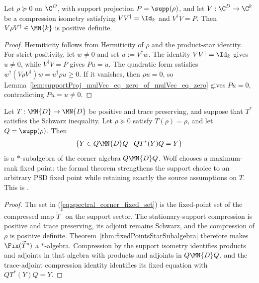 \begin{theorem}%
    \label{thm:compression_on_support_posDef}
    \leanok
    Let $\rho\succeq0$ on $\C^D$, with support projection
    $P=\supp(\rho)$, and let $V:\C^D\to\C^k$ be a compression isometry
    satisfying $VV^\dagger=\Id_k$ and $V^\dagger V=P$. Then
    $V\rho V^\dagger\in\MN{k}$ is positive definite.
\end{theorem}

\begin{proof}\leanok
    Hermiticity follows from Hermiticity of $\rho$ and the product-star
    identity. For strict positivity, let $w\neq0$ and set $u:=V^\dagger w$.
    The identity $VV^\dagger=\Id_k$ gives $u\neq0$, while
    $V^\dagger V=P$ gives $Pu=u$. The quadratic form satisfies
    $w^\dagger(V\rho V^\dagger)w=u^\dagger\rho u\geq0$. If it vanishes,
    then $\rho u=0$, so
    Lemma~\ref{lem:supportProj_mulVec_eq_zero_of_mulVec_eq_zero} gives
    $Pu=0$, contradicting $Pu=u\neq0$.
\end{proof}

\begin{theorem}%
    \label{thm:cornerFixedPointsStarSubalgebra}
    \leanok
    Let $T:\MN{D}\to\MN{D}$ be positive and trace preserving, and suppose
    that $T^*$ satisfies the Schwarz inequality. Let $\rho\succeq0$ satisfy
    $T(\rho)=\rho$, and let $Q=\supp(\rho)$. Then
    \begin{align}
        \{Y\in Q\MN{D}Q\mid QT^*(Y)Q=Y\}
        \label{eq:spectral_corner_fixed_set}
    \end{align}
    is a $*$-subalgebra of the corner algebra $Q\MN{D}Q$. Wolf chooses a
    maximum-rank fixed point; the formal theorem strengthens the support
    choice to an arbitrary PSD fixed point while retaining exactly the
    source assumptions on $T$. This is
    \cite[Corollary~6.6 and Equation~(6.61)]{Wolf2012Quantum}.
\end{theorem}

\begin{proof}
    \leanok
    The set in (\ref{eq:spectral_corner_fixed_set}) is the fixed-point set
    of the compressed map $\widetilde{T}^*$ on the support sector.
    The stationary-support compression is positive and trace preserving,
    its adjoint remains Schwarz, and the compression of $\rho$ is positive
    definite. Theorem~\ref{thm:fixedPointsStarSubalgebra} therefore makes
    $\Fix(\widetilde{T}^*)$ a $*$-algebra. Compression by the support
    isometry identifies products and adjoints in that algebra with products
    and adjoints in $Q\MN{D}Q$, and the trace-adjoint compression identity
    identifies its fixed equation with $QT^*(Y)Q=Y$.
\end{proof}

